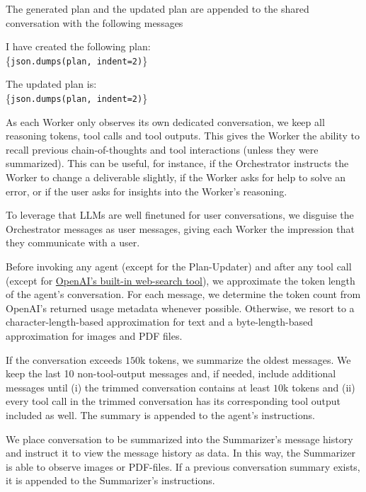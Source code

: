\documentclass[submission, Phys]{SciPost}
\begin{document}
The generated plan and the updated plan are appended to the shared conversation with the following messages
%
\begin{planblock}
I have created the following plan:\\
\{\lstinline|json.dumps(plan, indent=2)|\}
\end{planblock}
%
\begin{planblock}
The updated plan is:\\
\{\lstinline|json.dumps(plan, indent=2)|\}
\end{planblock}


As each Worker only observes its own dedicated conversation, we keep all reasoning tokens, tool calls and tool outputs. This gives the Worker the ability to recall previous chain-of-thoughts and tool interactions (unless they were summarized). This can be useful, for instance, if the Orchestrator instructs the Worker to change a deliverable slightly, if the Worker asks for help to solve an error, or if the user asks for insights into the Worker's reasoning.

To leverage that LLMs are well finetuned for user conversations, we disguise the Orchestrator messages as user messages, giving each Worker the impression that they communicate with a user.



Before invoking any agent (except for the Plan-Updater) and after any tool call (except for \href{https://platform.openai.com/docs/guides/tools-web-search}{OpenAI's built-in web-search tool}), we approximate the token length of the agent's conversation. For each message, we determine the token count from OpenAI's returned usage metadata whenever possible. Otherwise, we resort to a character-length-based approximation for text and a byte-length-based approximation for images and PDF files.

If the conversation exceeds $150$k tokens, we summarize the oldest messages. We keep the last 10 non-tool-output messages and, if needed, include additional messages until (i) the trimmed conversation contains at least $10$k tokens and (ii) every tool call in the trimmed conversation has its corresponding tool output included as well. The summary is appended to the agent's instructions.

We place conversation to be summarized into the Summarizer's message history
and instruct it to view the message history as data. In this way, the Summarizer is able to observe images or PDF-files. If a previous conversation summary exists, it is appended to the Summarizer's instructions.
\end{document}
